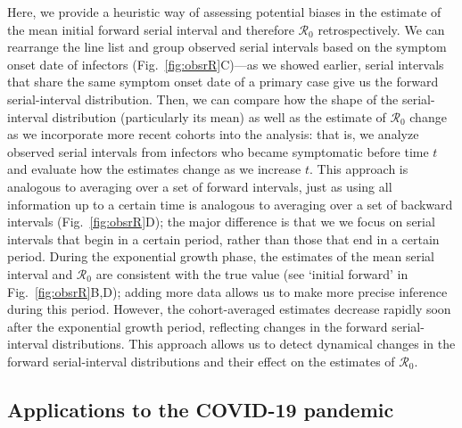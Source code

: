 \documentclass[12pt]{article}
\newcommand{\fref}[1]{Fig.~\ref{fig:#1}}
\newcommand{\Rx}[1]{\ensuremath{{\mathcal R}_{#1}}\xspace}
\newcommand{\Ro}{\Rx{0}}
\begin{document}
Here, we provide a heuristic way of assessing potential biases in the estimate of the mean initial forward serial interval and therefore \Ro retrospectively.
We can rearrange the line list and group observed serial intervals based on the symptom onset date of infectors (\fref{obsrR}C)---as we showed earlier, serial intervals that share the same symptom onset date of a primary case give us the forward serial-interval distribution.
Then, we can compare how the shape of the serial-interval distribution (particularly its mean) as well as the estimate of \Ro change as we incorporate more recent cohorts into the analysis:
that is, we analyze observed serial intervals from infectors who became symptomatic before time $t$ and evaluate how the estimates change as we increase $t$.
This approach is analogous to averaging over a set of forward intervals, just as using all information up to a certain time is analogous to averaging over a set of backward intervals (\fref{obsrR}D);
the major difference is that we we focus on serial intervals that begin in a certain period, rather than those that end in a certain period.
During the exponential growth phase, the estimates of the mean serial interval and \Ro are consistent with the true value (see `initial forward' in \fref{obsrR}B,D);
adding more data allows us to make more precise inference during this period.
However, the cohort-averaged estimates decrease rapidly soon after the exponential growth period, reflecting changes in the forward serial-interval distributions.
This approach allows us to detect dynamical changes in the forward serial-interval distributions and their effect on the estimates of \Ro.

\subsection{Applications to the COVID-19 pandemic}
\end{document}
